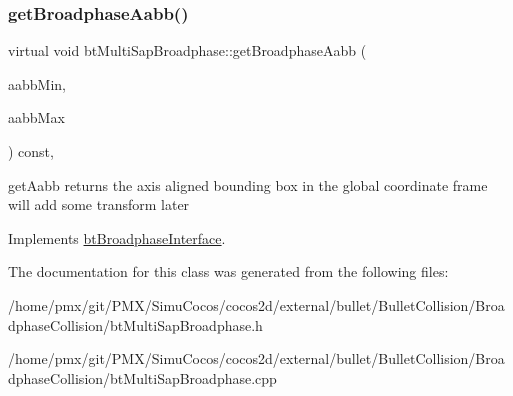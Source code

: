 \subsubsection{\texorpdfstring{get\+Broadphase\+Aabb()}{getBroadphaseAabb()}\hspace{0.1cm}{\footnotesize\ttfamily [2/2]}}
{\footnotesize\ttfamily virtual void bt\+Multi\+Sap\+Broadphase\+::get\+Broadphase\+Aabb (\begin{DoxyParamCaption}\item[{bt\+Vector3 \&}]{aabb\+Min,  }\item[{bt\+Vector3 \&}]{aabb\+Max }\end{DoxyParamCaption}) const\hspace{0.3cm}{\ttfamily [inline]}, {\ttfamily [virtual]}}

get\+Aabb returns the axis aligned bounding box in the \textquotesingle{}global\textquotesingle{} coordinate frame will add some transform later 

Implements \hyperlink{classbtBroadphaseInterface_ab5af9e26414f5a72a76040b8fab4d9e2}{bt\+Broadphase\+Interface}.



The documentation for this class was generated from the following files\+:\begin{DoxyCompactItemize}
\item 
/home/pmx/git/\+P\+M\+X/\+Simu\+Cocos/cocos2d/external/bullet/\+Bullet\+Collision/\+Broadphase\+Collision/bt\+Multi\+Sap\+Broadphase.\+h\item 
/home/pmx/git/\+P\+M\+X/\+Simu\+Cocos/cocos2d/external/bullet/\+Bullet\+Collision/\+Broadphase\+Collision/bt\+Multi\+Sap\+Broadphase.\+cpp\end{DoxyCompactItemize}
